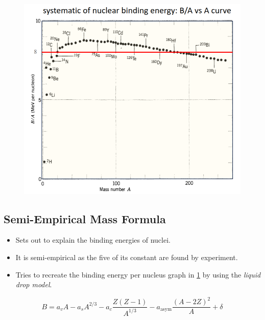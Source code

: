 \begin{figure}[h!]
\centering
\includegraphics[width = .75\textwidth]{BE_per_nucleon.png}
\caption{}
\label{fig: BE_per_nucleon}
\end{figure}

\subsection{Semi-Empirical Mass Formula}
\begin{itemize}
    \item Sets out to explain the binding energies of nuclei.
    \item It is semi-empirical as the five of its constant are found by experiment.
    \item Tries to recreate the binding energy per nucleus graph in \cref{fig: BE_per_nucleon} by using the \textit{liquid drop model}.
\end{itemize}

\begin{equation}\label{eq: semi_empirical_mass_formula}
B = a_vA - a_sA^{2 / 3} - a_c\frac{Z(Z-1)}{A^{1 / 3}} - a_{\text{asym}}\frac{(A-2Z)^2}{A} + δ
\end{equation}
